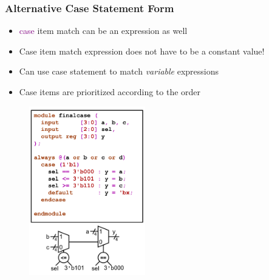 \documentclass[t, notes, xcolor=table]{beamer}
\begin{document}
\begin{frame}
\frametitle{Alternative Case Statement Form}
\scriptsize{
\begin{multicols}{2}
\begin{itemize}
\item \textcolor{purple}{case} item match can be an expression as well
\item Case item match expression does not have to be a constant value!
\item Can use case statement to match \textit{variable} expressions
\item Case items are prioritized according to the order
\end{itemize}
\vfill
\columnbreak
\begin{figure}
    \includegraphics[width=0.45\textwidth]{img/06_alt.png}
\end{figure}
\end{multicols}
}
\end{frame}
\end{document}
